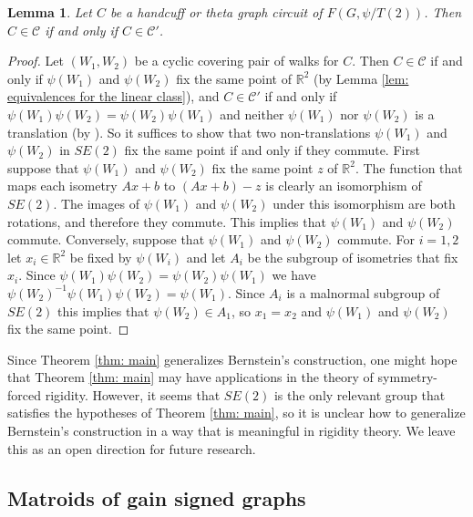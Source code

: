 \documentclass[12pt]{article}
\newtheorem{lemma}[theorem]{Lemma}
\theoremstyle{definition}
\newcommand{\bR}{\mathbb R}
\newcommand{\cC}{\mathcal{C}}
\begin{document}
\begin{lemma} \label{lem: equivalence with Bernstein}
    Let $C$ be a handcuff or theta graph circuit of $F(G, \psi/T(2))$.
    Then $C \in \cC$ if and only if $C \in \cC'$.
\end{lemma}
\begin{proof}
Let $(W_1, W_2)$ be a cyclic covering pair of walks for $C$.
Then $C \in \cC$ if and only if $\psi(W_1)$ and $\psi(W_2)$ fix the same point of $\bR^2$ (by Lemma \ref{lem: equivalences for the linear class}), and $C \in \cC'$ if and only if $\psi(W_1)\psi(W_2) = \psi(W_2)\psi(W_1)$ and neither $\psi(W_1)$ nor $\psi(W_2)$ is a translation (by \cite[Lemma 5.9]{Bernstein2022}). 
So it suffices to show that two non-translations $\psi(W_1)$ and $\psi(W_2)$ in $SE(2)$ fix the same point if and only if they commute.
First suppose that $\psi(W_1)$ and $\psi(W_2)$ fix the same point $z$ of $\bR^2$.
The function that maps each isometry $Ax + b$ to $(Ax + b) - z$ is clearly an isomorphism of $SE(2)$.
The images of $\psi(W_1)$ and $\psi(W_2)$ under this isomorphism are both rotations, and therefore they commute.
This implies that $\psi(W_1)$ and $\psi(W_2)$ commute.
Conversely, suppose that $\psi(W_1)$ and $\psi(W_2)$ commute.
For $i = 1,2$ let $x_i \in \bR^2$ be fixed by $\psi(W_i)$ and let $A_i$ be the subgroup of isometries that fix $x_i$.
Since $\psi(W_1)\psi(W_2) = \psi(W_2)\psi(W_1)$ we have $\psi(W_2)^{-1}\psi(W_1)\psi(W_2) = \psi(W_1)$.
Since $A_i$ is a malnormal subgroup of $SE(2)$ this implies that $\psi(W_2) \in A_1$, so $x_1 = x_2$ and $\psi(W_1)$ and $\psi(W_2)$ fix the same point.
\end{proof}


Since Theorem \ref{thm: main} generalizes Bernstein's construction, one might hope that Theorem \ref{thm: main} may have applications in the theory of symmetry-forced rigidity.
However, it seems that $SE(2)$ is the only relevant group that satisfies the hypotheses of Theorem \ref{thm: main}, so it is unclear how to generalize Bernstein's construction in a way that is meaningful in rigidity theory.
We leave this as an open direction for future research.






\subsection{Matroids of gain signed graphs} \label{sec: gain signed graphs}
\end{document}
